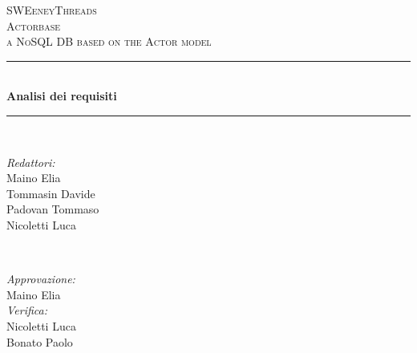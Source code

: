\documentclass[a4paper]{article}
\begin{document}
	
	\begin{titlepage}
		\newcommand{\HRule}{\rule{\linewidth}{0.5mm}} 
		\center  
		
		\textsc{\LARGE SWEeneyThreads}\\[1.5cm] 
		\textsc{\Large Actorbase}\\[0.5cm] 
		\textsc{\large a NoSQL DB based on the Actor model}\\[0.5cm]
		
		
		\HRule \\[0.4cm]
		{ \huge \bfseries Analisi dei requisiti}\\[0.4cm] 
		\HRule \\[1.5cm]
		
		\begin{minipage}{0.4\textwidth}
			\begin{flushleft} \large
				\emph{Redattori:}\\
				Maino Elia \\
				Tommasin Davide \\
                Padovan Tommaso \\
				Nicoletti Luca
			\end{flushleft}
		\end{minipage}
		~
		\begin{minipage}{0.4\textwidth}
			\begin{flushright} \large
				\emph{Approvazione:} \\
				Maino Elia \\
				\emph{Verifica:} \\
                Nicoletti Luca \\
                Bonato Paolo \\
			\end{flushright}
		\end{minipage}
		

\end{titlepage}
\end{document}
